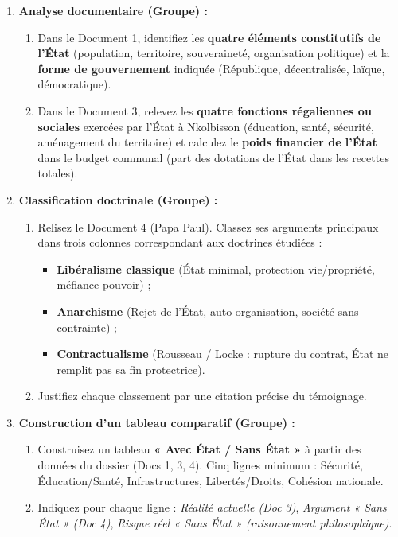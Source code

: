 \documentclass[11pt]{article}
\newcounter{popsec}
\newcounter{popsub}
\newcommand{\courssub}[1]{%
  \stepcounter{popsub}%
  \par\vspace{9pt}\noindent{\popxbold\fontsize{11.5}{13}\selectfont\color{popink}{\color{poporange}\thepopsec.\thepopsub}\hspace{6pt}#1}\par\nopagebreak\vspace{4pt}
}
\begin{document}
\courssub{Consignes}
\begin{enumerate}
    \item \textbf{Analyse documentaire (Groupe) :} 
    \begin{enumerate}
        \item Dans le Document 1, identifiez les \textbf{quatre éléments constitutifs de l'État} (population, territoire, souveraineté, organisation politique) et la \textbf{forme de gouvernement} indiquée (République, décentralisée, laïque, démocratique).
        \item Dans le Document 3, relevez les \textbf{quatre fonctions régaliennes ou sociales} exercées par l'État à Nkolbisson (éducation, santé, sécurité, aménagement du territoire) et calculez le \textbf{poids financier de l'État} dans le budget communal (part des dotations de l'État dans les recettes totales).
    \end{enumerate}
    \item \textbf{Classification doctrinale (Groupe) :} 
    \begin{enumerate}
        \item Relisez le Document 4 (Papa Paul). Classez ses arguments principaux dans trois colonnes correspondant aux doctrines étudiées : 
        \begin{itemize}
            \item \textbf{Libéralisme classique} (État minimal, protection vie/propriété, méfiance pouvoir) ;
            \item \textbf{Anarchisme} (Rejet de l'État, auto-organisation, société sans contrainte) ;
            \item \textbf{Contractualisme} (Rousseau / Locke : rupture du contrat, État ne remplit pas sa fin protectrice).
        \end{itemize}
        \item Justifiez chaque classement par une citation précise du témoignage.
    \end{enumerate}
    \item \textbf{Construction d'un tableau comparatif (Groupe) :} 
    \begin{enumerate}
        \item Construisez un tableau \textbf{« Avec État / Sans État »} à partir des données du dossier (Docs 1, 3, 4). Cinq lignes minimum : Sécurité, Éducation/Santé, Infrastructures, Libertés/Droits, Cohésion nationale.
        \item Indiquez pour chaque ligne : \textit{Réalité actuelle (Doc 3)}, \textit{Argument « Sans État » (Doc 4)}, \textit{Risque réel « Sans État » (raisonnement philosophique)}.

\end{enumerate}
\end{enumerate}
\end{document}
